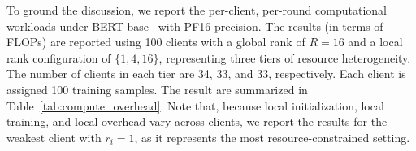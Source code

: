 \documentclass{article} %
\begin{document}
%
{To ground the discussion, we report the per-client, per-round computational workloads under BERT-base~\cite{devlin2019bert} with PF16 precision. The results (in terms of FLOPs) are reported using 100 clients with a global rank of $R{=}16$ and a local rank configuration of $\{1,4,16\}$, representing three tiers of resource heterogeneity. The number of clients in each tier are 34, 33, and 33, respectively. Each client is assigned 100 training samples. The result are summarized in Table~\ref{tab:compute_overhead}. Note that, because local initialization, local training, and local overhead vary across clients, we report the results for the weakest client with $r_i=1$, as it represents the most resource-constrained setting.
}
\end{document}
